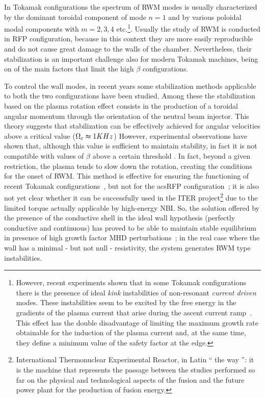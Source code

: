 In Tokamak configurations the spectrum of RWM modes is usually characterized by the dominant toroidal component of mode $ n = 1 $ and by various poloidal modal components with $m=2,3,4$ etc.\footnote{
However, recent experiments shown that in some Tokamak configurations there is the presence of ideal \textit{kink} instabilities of non-resonant \emph{current driven} modes. These instabilities seem to be excited by the free energy in the gradients of the plasma current that arise during the ascent current ramp~\cite{baruzzo9, baruzzo10, baruzzo11}. This effect has the double disadvantage of limiting the maximum growth rate obtainable for the induction of the plasma current and, at the same time, they define a minimum value of the safety factor at the edge.}.
%
Usually the study of \acs{RWM} is conducted in \acs{RFP} configuration, because in this context they are more easily reproducible and do not cause great damage to the walls of the chamber. Nevertheless, their stabilization is an important challenge also for modern Tokamak machines, being on of the main factors that limit the high $\beta$ configurations.

To control the wall modes, in recent years some stabilization methods applicable to both the two configurations have been studied. Among these the stabilization based on the plasma rotation effect consists in the production of a toroidal angular momentum through the orientation of the neutral beam injector. This theory suggests that stabilization can be effectively achieved for angular velocities above a critical value ($\Omega_c \thickapprox 1KHz$) However, experimental observations have shown that, although this value is sufficient to maintain stability, in fact it is not compatible with values of $\beta$ above a certain threshold \cite{baruzzo12}. In fact, beyond a given restriction, the plasma tends to slow down the rotation, creating the conditions for the onset of \acs{RWM}. This method is effective for ensuring the functioning of recent Tokamak configurations~\cite{baruzzo12}, but not for the acs{RFP} configuration~\cite{baruzzo13}; it is also not yet clear whether it can be successfully used in the ITER project\footnote{International Thermonuclear Experimental Reactor, in Latin `` the way '': it is the machine that represents the passage between the studies performed so far on the physical and technological aspects of the fusion and the future power plant for the production of fusion energy.} due to the limited torque actually applicable by high-energy \acs{NBI}.
%
So, the solution offered by the presence of the conductive shell in the ideal wall hypothesis (perfectly conductive and continuous) has proved to be able to maintain stable equilibrium in presence of high growth factor MHD perturbations~\cite{gimblett_5,gimblett_6}; in the real case where the wall has a minimal - but not null - resistivity, the system generates \acs{RWM} type instabilities.

